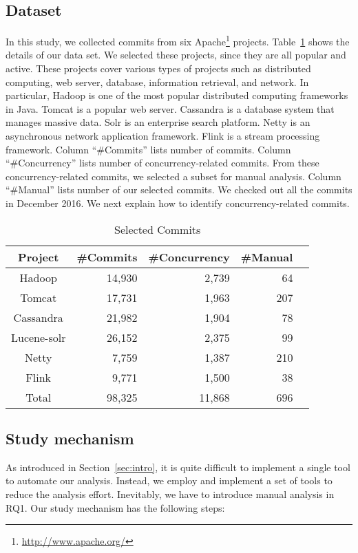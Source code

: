 \subsection{Dataset}
\label{sec:method:data}
In this study, we collected commits from six Apache\footnote{\url{http://www.apache.org/}} projects. Table~\ref{table:dataset} shows the details of our data set. We selected these projects, since they are all popular and active. These projects cover various types of projects such as distributed computing, web server, database, information retrieval, and network. In particular, Hadoop is one of the most popular distributed computing frameworks in Java. Tomcat is a popular web server. Cassandra is a database system that manages massive data. Solr is an enterprise search platform. Netty is an asynchronous network application framework. Flink is a stream processing framework. Column ``\#Commits'' lists number of commits. Column ``\#Concurrency'' lists number of concurrency-related commits. From these concurrency-related commits, we selected a subset for manual analysis. Column ``\#Manual'' lists number of our selected commits. We checked out all the commits in December 2016. We next explain how to identify concurrency-related commits.

\begin{table}
	\centering
	\caption{Selected Commits}\vspace*{-2ex}
    \label{table:dataset}
	\begin{tabular}{|c|r|r|r|r|}\hline
		Project&\#Commits&\#Concurrency&\#Manual\\\hline
		Hadoop&14,930&2,739&64\\
		Tomcat&17,731&1,963&207\\
		Cassandra&21,982&1,904&78\\
		Lucene-solr&26,152&2,375&99\\
		Netty&7,759&1,387&210\\
		Flink&9,771&1,500&38\\\hline
		Total&98,325&11,868&696\\\hline
	\end{tabular}\vspace*{-3ex}
\end{table}

\subsection{Study mechanism}
\label{sec:method:tool}
As introduced in Section~\ref{sec:intro}, it is quite difficult to implement a single tool to automate our analysis. Instead, we employ and implement a set of tools to reduce the analysis effort. Inevitably, we have to introduce manual analysis in RQ1. Our study mechanism has the following steps:

